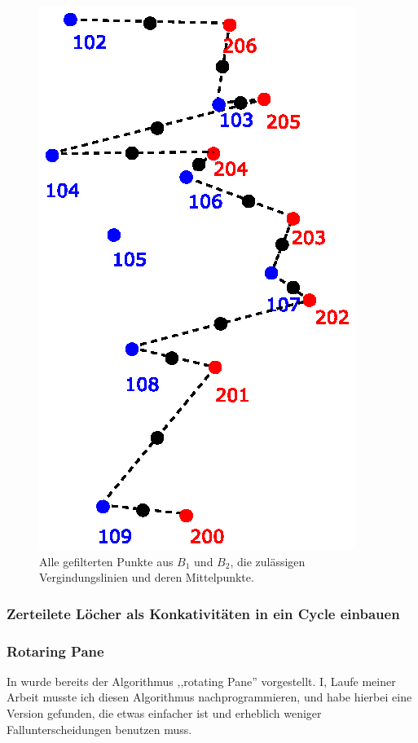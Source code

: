\begin{figure}
	\centering
	\includegraphics[scale=0.6]{Mittelpunkte.eps}
	\caption{Alle gefilterten Punkte aus $B_1$ und $B_2$, die zulässigen Vergindungslinien und deren Mittelpunkte.}
	\label{fig:Mittelpunkte}
\end{figure}



\subsubsection{Zerteilete Löcher als Konkativitäten in ein Cycle einbauen}\label{JoinLL}

\subsubsection{Rotaring Pane} \label{rotPane}
In \cite{TG} wurde bereits der Algorithmus ,,rotating Pane'' vorgestellt. I, Laufe meiner Arbeit musste ich diesen Algorithmus nachprogrammieren, und habe hierbei eine Version gefunden, die etwas einfacher ist und erheblich weniger Fallunterscheidungen benutzen muss.

